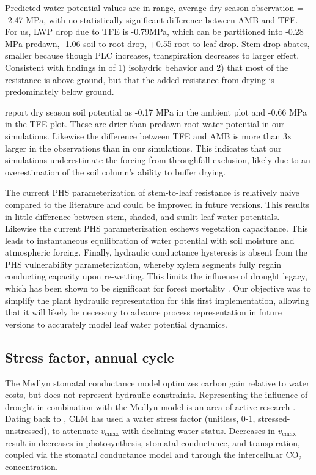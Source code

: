 \documentclass[draft,linenumbers]{agujournal}
\begin{document}
\cite{fisher2006}
Predicted water potential values are in range, average dry season observation = -2.47 MPa, 
with no statistically significant difference between AMB and TFE.
For us, LWP drop due to TFE is -0.79MPa, which can be partitioned into -0.28 MPa predawn, -1.06 soil-to-root drop, +0.55 root-to-leaf drop.
Stem drop abates, smaller because though PLC increases, transpiration decreases to larger effect.
Consistent with findings in \cite{fisher2006} of 
1) isohydric behavior
and
2) that most of the resistance is above ground, but that the added resistance from drying is predominately below ground.

\cite{fisher2006} report dry season soil potential as -0.17 MPa in the ambient plot and -0.66 MPa in the TFE plot.
These are drier than predawn root water potential in our simulations.
Likewise the difference between TFE and AMB is more than 3x larger in the observations than in our simulations.
This indicates that our simulations underestimate the forcing from throughfall exclusion, likely due to an overestimation of the 
soil column's ability to buffer drying.

The current PHS parameterization of stem-to-leaf resistance is relatively naive compared to the literature \citep{franks2007}
and could be improved in future versions. 
This results in little difference between stem, shaded, and sunlit leaf water potentials.
Likewise the current PHS parameterization eschews vegetation capacitance. \citep{meinzer2004}
This leads to instantaneous equilibration of water potential with soil moisture and atmospheric forcing.
Finally, hydraulic conductance hysteresis is absent from the PHS vulnerability parameterization, 
whereby xylem segments fully regain conducting capacity upon re-wetting.
This limits the influence of drought legacy, which has been shown to be significant for forest mortality \citep{anderegg2013}.
Our objective was to simplify the plant hydraulic representation for this first implementation, 
allowing that it will likely be necessary to advance process representation in future versions
to accurately model leaf water potential dynamics.

\subsection{Stress factor, annual cycle}

The Medlyn stomatal conductance model optimizes carbon gain relative to water costs, but does not represent hydraulic constraints.
Representing the influence of drought in combination with the Medlyn model is an area of active research \citep{zhou2013,novick2016a}.
Dating back to \cite{sellers1996a}, CLM has used a water stress factor (unitless, 0-1, stressed-unstressed), to attenuate $v_{\text{cmax}}$ with declining water status. Decreases in $v_{\text{cmax}}$ result in decreases in photosynthesis, stomatal conductance, and transpiration, coupled via the stomatal conductance model and through the intercellular CO$_2$ concentration.
\end{document}
